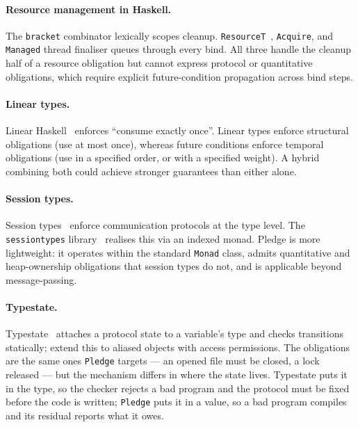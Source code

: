 \documentclass[acmsmall,screen]{acmart}
\begin{document}
\paragraph{Resource management in Haskell.}
The \lstinline{bracket} combinator lexically scopes cleanup.
\lstinline{ResourceT}~\cite{snoyman2011resourcet}, \lstinline{Acquire}, and
\lstinline{Managed} thread finaliser queues through every bind.
All three handle the cleanup half of a resource obligation but cannot express
protocol or quantitative obligations, which require explicit future-condition
propagation across bind steps.

\paragraph{Linear types.}
Linear Haskell~\cite{bernardy2018linear} enforces ``consume exactly once''.
Linear types enforce structural obligations (use at most once), whereas
future conditions enforce temporal obligations (use in a specified order,
or with a specified weight).
A hybrid combining both could achieve stronger guarantees than either alone.

\paragraph{Session types.}
Session types~\cite{honda1993,gay2010} enforce communication protocols at the
type level.
The \lstinline{sessiontypes} library~\cite{sessiontypes2017} realises this
via an indexed monad.
Pledge is more lightweight: it operates within the standard \lstinline{Monad}
class, admits quantitative and heap-ownership obligations that session types
do not, and is applicable beyond message-passing.

\paragraph{Typestate.}
Typestate~\cite{strom1986} attaches a protocol state to a variable's type
and checks transitions statically; \citet{bierhoff2007} extend this to
aliased objects with access permissions.
The obligations are the same ones \lstinline{Pledge} targets --- an opened
file must be closed, a lock released --- but the mechanism differs in where
the state lives.
Typestate puts it in the type, so the checker rejects a bad program and the
protocol must be fixed before the code is written;
\lstinline{Pledge} puts it in a value, so a bad program compiles and its
residual reports what it owes.
\end{document}
